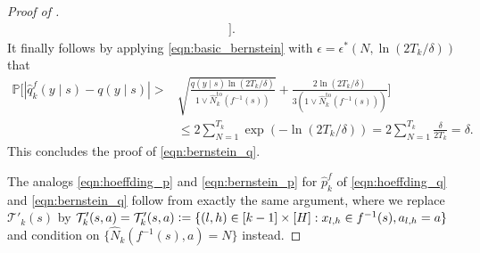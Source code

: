 \documentclass[10pt,a4paper]{amsart}
\newcommand{\eqdef}{\vcentcolon=}
\newcommand{\mbbP}{\mathbb{P}}
\newcommand{\mcT}{\mathcal{T}}
\begin{document}
\begin{proof}[Proof of ]
\begin{equation}
\begin{split}
			\bigr]
			.
		\end{split}
	\end{equation}
	It finally follows by applying \eqref{eqn:basic_bernstein} with $\epsilon=\epsilon^*(N,\ln(2T_k/\delta))$ that
	\begin{equation}
		\begin{split}
			\mbbP\biggl[
			| \hat{q}^f_k(y\mid s)-q(y\mid s) |
			>
			 &
			\sqrt{\frac{q(y\mid s) \ln(2T_k/\delta)}{1\vee\hat{N}^{\mathrm{to}}_k(f^{-1}(s))}}
			+
			\frac{2\ln(2T_k/\delta)}{3(1\vee\hat{N}^{\mathrm{to}}_k(f^{-1}(s)))}
			\biggr]
			\\
			 &
			\leq
			2\sum_{N=1}^{T_k}
			\exp(
			-
			\ln(2T_k/\delta)
			)
			=
			2\sum_{N=1}^{T_k}\frac{\delta}{2T_k}
			=
			\delta.
		\end{split}
	\end{equation}
	This concludes the proof of \eqref{eqn:bernstein_q}.

	The analogs \eqref{eqn:hoeffding_p} and \eqref{eqn:bernstein_p} for $\hat{p}_k^f$ of \eqref{eqn:hoeffding_q} and \eqref{eqn:bernstein_q} follow from exactly the same argument, where we replace $\mcT'_k(s)$ by $\mcT'_k(s,a)=\mcT'_k(s,a)\eqdef \{(l,h)\in[k-1]\times [H]:x_{l,h}\in f^{-1}(s),a_{l,h}=a\}$ and condition on $\{\hat{N}_k(f^{-1}(s),a)=N\}$ instead.
\end{proof}
\end{document}
